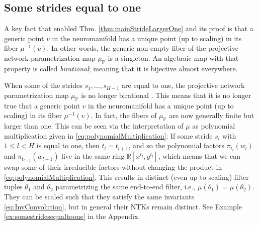 \documentclass[twoside]{article}
\theoremstyle{definition}
\theoremstyle{remark}
\begin{document}
\fi

\subsection{Some strides equal to one}


A key fact that enabled Thm. \ref{thm:mainStrideLargerOne} and its proof is that a generic point $v$ in the neuromanifold has a unique point (up to scaling) in its fiber $\mu^{-1}(v)$. 
In other words, the generic non-empty fiber of the projective network parametrization map $\mu_\mathbb{P}$ is a singleton. An algebraic map with that property is called \emph{birational}; meaning that it is bijective almost everywhere.

When some of the strides $s_1, \ldots, s_{H-1}$ are equal to one, the projective network parametrization map $\mu_\mathbb{P}$ is  no longer birational \cite{kohn2024function}.
This means that it is no longer true that a generic point $v$ in the neuromanifold has a unique point (up to scaling) in its fiber $\mu^{-1}(v)$.
In fact, the fibers of $\mu_\mathbb{P} $ are now generally finite but larger than one.
This can be seen via the interpretation  of $\mu$ as polynomial multiplication given in \eqref{eq:polynomialMultiplication}: 
If some stride $s_l$ with $1 \leq l <H$ is equal to one, then $t_l = t_{l+1}$, and so the polynomial factors $\pi_{t_l}(w_l)$ and $\pi_{t_{l+1}}(w_{l+1})$ live in the same ring $\mathbb{R}[x^{t_l},y^{t_l}]$, which means that we can swap some of their irreducible factors without changing the product in \eqref{eq:polynomialMultiplication}. This results in distinct (even up to scaling) filter tuples $\theta_1$ and $\theta_2$ parametrizing the same end-to-end filter, i.e., $\mu(\theta_1) = \mu(\theta_2)$.
They can be scaled such that they satisfy the same invariants \eqref{eq:InvConvolution}, but in general their NTKs remain distinct. See Example \ref{ex:somestridesequaltoone} in the Appendix.
 
\end{document}

